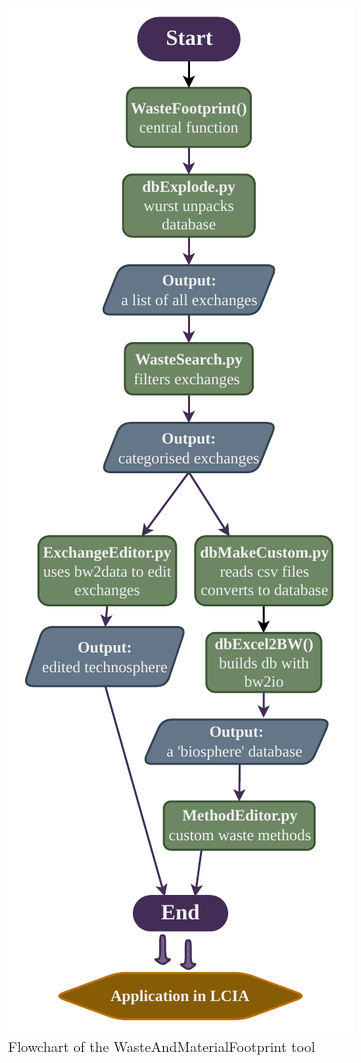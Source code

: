 \begin{figure}[h!]
    \centering
    \includegraphics[width=0.7\columnwidth]{figures/WMF_flowchart.pdf}
    \caption{Flowchart of the WasteAndMaterialFootprint tool }
    
    \label{fig:WMF_flowchart}
\end{figure}

